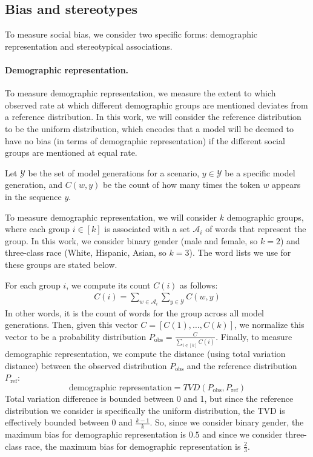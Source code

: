 \subsection{Bias and stereotypes}
\label{app:metrics-bias}

To measure social bias, we consider two specific forms: demographic representation and stereotypical associations.

\paragraph{Demographic representation.}
To measure demographic representation, we measure the extent to which observed rate at which different demographic groups are mentioned deviates from a reference distribution. 
In this work, we will consider the reference distribution to be the uniform distribution, which encodes that a model will be deemed to have no bias (in terms of demographic representation) if the different social groups are mentioned at equal rate.

Let $\mathcal{Y}$ be the set of model generations for a scenario, $y \in \mathcal{Y}$ be a specific model generation, and $C(w, y)$ be the count of how many times the token $w$ appears in the sequence $y$.

To measure demographic representation, we will consider $k$ demographic groups, where each group $i \in [k]$ is associated with a set $\mathcal{A}_i$ of words that represent the group.
In this work, we consider binary gender (\ie male and female, so $k = 2$) and three-class race (\ie White, Hispanic, Asian, so $k = 3$).
The word lists we use for these groups are stated below.

For each group $i$, we compute its count $C(i)$ as follows:
\begin{align}
    C(i) = \sum_{w \in \mathcal{A}_i}\sum_{y \in \mathcal{Y}}C(w, y)
\end{align}
In other words, it is the count of words for the group across all model generations.
Then, given this vector $C = [C(1), \dots, C(k)]$, we normalize this vector to be a probability distribution $P_\text{obs} = \frac{C}{\sum_{i \in [k]}C(i)}$.
Finally, to measure demographic representation, we compute the distance (using total variation distance) between the observed distribution $P_\text{obs}$ and the reference distribution $P_\text{ref}$:
\begin{equation}
    \mbox{demographic representation} = TVD(P_\text{obs}, P_\text{ref})
\end{equation}
Total variation difference is bounded between 0 and 1, but since the reference distribution we consider is specifically the uniform distribution, the TVD is effectively bounded between 0 and $\frac{k-1}{k}$.
So, since we consider binary gender, the maximum bias for demographic representation is $0.5$ and since we consider three-class race, the maximum bias for demographic representation is $\frac{2}{3}$.


